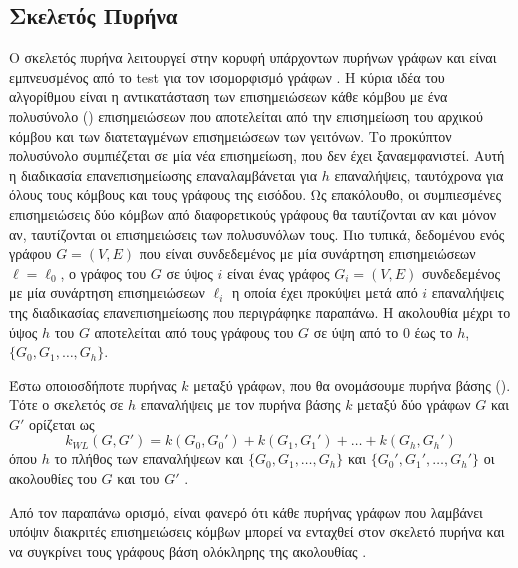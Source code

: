 \subsection{Σκελετός Πυρήνα }
\label{ssec:wl}
Ο σκελετός πυρήνα  λειτουργεί στην κορυφή υπάρχοντων πυρήνων γράφων και είναι εμπνευσμένος από το test  για τον ισομορφισμό γράφων \cite{weisfeiler1968reduction}.
Η κύρια ιδέα του αλγορίθμου  είναι η αντικατάσταση των επισημειώσεων κάθε κόμβου με ένα πολυσύνολο () επισημειώσεων που αποτελείται από την επισημείωση του αρχικού κόμβου και των διατεταγμένων επισημειώσεων των γειτόνων.
Το προκύπτον πολυσύνολο συμπιέζεται σε μία νέα επισημείωση, που δεν έχει ξαναεμφανιστεί.
Αυτή η διαδικασία επανεπισημείωσης επαναλαμβάνεται για $h$ επαναλήψεις, ταυτόχρονα για όλους τους κόμβους και τους γράφους της εισόδου.
Ως επακόλουθο, οι συμπιεσμένες επισημειώσεις δύο κόμβων από διαφορετικούς γράφους θα ταυτίζονται αν και μόνον αν, ταυτίζονται οι επισημειώσεις των πολυσυνόλων τους.
Πιο τυπικά, δεδομένου ενός γράφου $G=(V,E)$ που είναι συνδεδεμένος με μία συνάρτηση επισημειώσεων $\ell=\ell_0$, ο γράφος  του $G$ σε ύψος $i$ είναι ένας γράφος $G_i=(V,E)$ συνδεδεμένος με μία συνάρτηση επισημειώσεων $\ell_i$ η οποία έχει προκύψει μετά από $i$ επαναλήψεις της διαδικασίας επανεπισημείωσης που περιγράφηκε παραπάνω.
Η ακολουθία  μέχρι το ύψος $h$ του $G$ αποτελείται από τους γράφους  του $G$ σε ύψη από το $0$ έως το $h$, $\{ G_0,G_1,\ldots,G_h\}$. 
\begin{definition}
	Έστω οποιοσδήποτε πυρήνας $k$ μεταξύ γράφων, που θα ονομάσουμε πυρήνα βάσης ().
	Τότε ο σκελετός  σε $h$ επαναλήψεις με τον πυρήνα βάσης $k$ μεταξύ δύο γράφων $G$ και $G'$ ορίζεται ως
	\begin{equation}
		k_{WL}(G,G') = k(G_0,G_0') + k(G_1,G_1') + \ldots + k(G_h,G_h')
	\end{equation}
	όπου $h$ το πλήθος των επαναλήψεων  και $\{ G_0,G_1,\ldots,G_h\}$ και $\{ G_0',G_1',\ldots,G_h'\}$ οι ακολουθίες  του $G$ και του $G'$ .
\end{definition}
Από τον παραπάνω ορισμό, είναι φανερό ότι κάθε πυρήνας γράφων που λαμβάνει υπόψιν διακριτές επισημειώσεις κόμβων μπορεί να ενταχθεί στον σκελετό πυρήνα  και να συγκρίνει τους γράφους βάση ολόκληρης της ακολουθίας .\par

